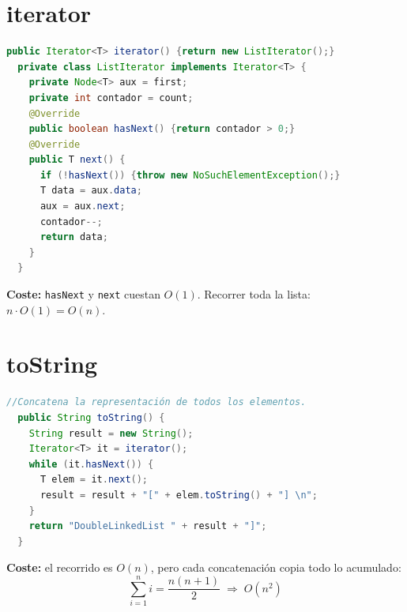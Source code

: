 \documentclass[a4paper,11pt]{report}
\newcommand{\coste}[1]{\par\bigskip\noindent\textbf{Coste:} #1\par\bigskip}
\begin{document}
\begin{minipage}{0.95\linewidth}
\section{\label{iterator}iterator}
\begin{lstlisting}[language=Java]
  public Iterator<T> iterator() {return new ListIterator();}
  private class ListIterator implements Iterator<T> {
    private Node<T> aux = first;
    private int contador = count;
    @Override
    public boolean hasNext() {return contador > 0;}
    @Override
    public T next() {
      if (!hasNext()) {throw new NoSuchElementException();}
      T data = aux.data;
      aux = aux.next;
      contador--;
      return data;
    }
  }
\end{lstlisting}
\end{minipage}\smallskip


\coste{\texttt{hasNext} y \texttt{next} cuestan $O(1)$. Recorrer toda la lista: $n \cdot O(1) = O(n)$.}

\begin{minipage}{0.95\linewidth}
\section{\label{toString}toString}
\begin{lstlisting}[language=Java]
  //Concatena la representación de todos los elementos.
  public String toString() {
    String result = new String();
    Iterator<T> it = iterator();
    while (it.hasNext()) {
      T elem = it.next();
      result = result + "[" + elem.toString() + "] \n";
    }
    return "DoubleLinkedList " + result + "]";
  }
\end{lstlisting}
\end{minipage}\smallskip

\coste{el recorrido es $O(n)$, pero cada concatenación copia todo lo acumulado:
\[ \sum_{i=1}^{n} i = \frac{n(n+1)}{2} \;\Rightarrow\; O(n^2) \]}
\end{document}
